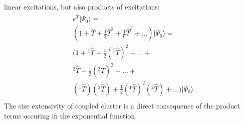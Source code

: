 linear excitations, but also products of excitations:
%
\begin{equation}
\begin{aligned}
  & e^{\hat{T}} |\Psi_{0}\rangle = \\
  & (1 + \hat{T} + \frac{1}{2} \hat{T}^{2} + \frac{1}{6} \hat{T}^3 + \ldots) | 
\Psi_{0} \rangle = \\
  & (1 + {}^{1}\hat{T} + \frac{1}{2}({}^{1}\hat{T})^{2} + \ldots + \\
  & {}^{2}\hat{T} + \frac{1}{2}({}^{2}\hat{T})^{2} + \ldots + \\
  & ({}^{1}\hat{T}) ({}^{2}\hat{T}) + \frac{1}{2}({}^{1}\hat{T})^{2} 
({}^{2}\hat{T}) + \ldots) |\Psi_{0} \rangle \\
\end{aligned}
\end{equation}
%
The size extensivity of coupled cluster is a direct consequence of the 
product terms occuring in the exponential function. 

